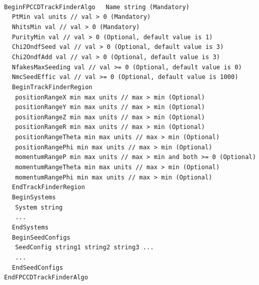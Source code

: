 ~\\
\noindent
{\tt BeginFPCCDTrackFinderAlgo}
$~~~~~${\tt Name              string                (Mandatory)} \\
$~~~~~${\tt PtMin             val units // val > 0  (Mandatory)} \\
$~~~~~${\tt NhitsMin          val       // val > 0  (Mandatory)} \\
$~~~~~${\tt PurityMin         val       // val > 0  (Optional, default value is 1)} \\
$~~~~~${\tt Chi2OndfSeed      val       // val > 0  (Optional, default value is 3)} \\
$~~~~~${\tt Chi2OndfAdd       val       // val > 0  (Optional, default value is 3)} \\
$~~~~~${\tt NfakesMaxSeeding  val       // val >= 0 (Optional, default value is 0)} \\
$~~~~~${\tt NmcSeedEffic      val       // val >= 0 (Optional, default value is 1000)} \\
$~~~~~${\tt BeginTrackFinderRegion} \\
$~~~~~~~${\tt positionRangeX      min  max  units // max > min (Optional)} \\
$~~~~~~~${\tt positionRangeY      min  max  units // max > min (Optional)} \\
$~~~~~~~${\tt positionRangeZ      min  max  units // max > min (Optional)} \\
$~~~~~~~${\tt positionRangeR      min  max  units // max > min (Optional)} \\
$~~~~~~~${\tt positionRangeTheta  min  max  units // max > min (Optional)} \\
$~~~~~~~${\tt positionRangePhi    min  max  units // max > min (Optional)} \\
$~~~~~~~${\tt momentumRangeP      min  max  units // max > min and both >= 0 (Optional)} \\
$~~~~~~~${\tt momentumRangeTheta  min  max  units // max > min (Optional)} \\
$~~~~~~~${\tt momentumRangePhi    min  max  units // max > min (Optional)} \\
$~~~~~${\tt EndTrackFinderRegion} \\
$~~~~~${\tt BeginSystems} \\
$~~~~~~~${\tt System   string} \\
$~~~~~~~${\tt ...} \\
$~~~~~${\tt EndSystems} \\
$~~~~~${\tt BeginSeedConfigs} \\
$~~~~~~~${\tt SeedConfig   string1  string2  string3 ...} \\
$~~~~~~~${\tt ...} \\
$~~~~~${\tt EndSeedConfigs} \\
{\tt EndFPCCDTrackFinderAlgo}

